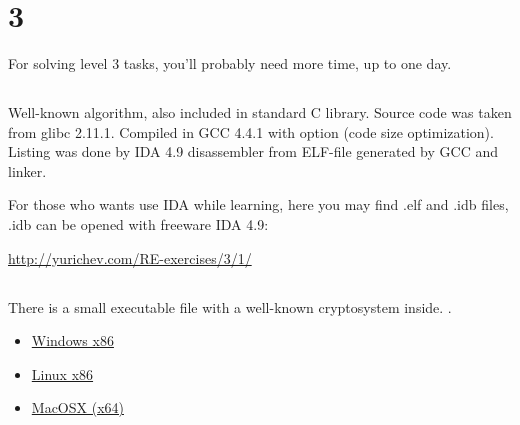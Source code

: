 ﻿\section{ 3}

{For solving level 3 tasks, you'll probably need more time, up to one day}.

\subsection{}

{Well-known algorithm, also included in standard C library. Source code was taken from glibc 2.11.1.
Compiled in GCC 4.4.1 with  option (code size optimization).
Listing was done by IDA 4.9 disassembler from ELF-file generated by GCC and linker.}

{For those who wants use IDA while learning, here you may find .elf and .idb files,
.idb can be opened with freeware IDA 4.9:}

\url{http://yurichev.com/RE-exercises/3/1/}



\subsection{}

{There is a small executable file with a well-known cryptosystem inside}.
.

\begin{itemize}
\item
\href{http://yurichev.com/RE-exercises/3/2/unknown_cryptosystem.exe}{Windows x86}

\item
\href{http://yurichev.com/RE-exercises/3/2/unknown_encryption_linux86.tar}{Linux x86}

\item
\href{http://yurichev.com/RE-exercises/3/2/unknown_encryption_MacOSX.tar}{MacOSX (x64)}
\end{itemize}

